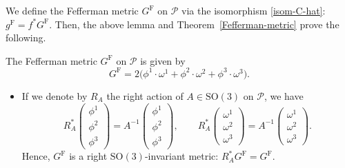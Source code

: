 We define the Fefferman metric $G^{\mathrm{F}}$ on $\mathcal{P}$ via the isomorphism \eqref{isom-C-hat}: $g^{\mathrm{F}}=f^* G^{\mathrm{F}}$. Then, the above lemma and Theorem~\ref{Fefferman-metric} prove the following.

\begin{Proposition}
The Fefferman metric $G^{\mathrm{F}}$ on $\mathcal{P}$ is given by
\[
G^{\mathrm{F}}=2\bigl( \phi^1\cdot\omega^1+ \phi^2\cdot\omega^2+ \phi^3\cdot\omega^3\bigr).
\]
\end{Proposition}

\begin{Remark}\quad
\begin{itemize}\itemsep=0pt
\item[(i)]
If we denote by $R_A$ the right action of $A\in\mathrm{SO}(3)$ on $\mathcal{P}$, we have
\[
R_A^*\begin{pmatrix}
\phi^1 \\ \phi^2 \\ \phi^3
\end{pmatrix}=A^{-1}\begin{pmatrix}
\phi^1 \\ \phi^2 \\ \phi^3
\end{pmatrix}, \qquad R_A^*\begin{pmatrix}
\omega^1 \\ \omega^2 \\ \omega^3
\end{pmatrix}=A^{-1}\begin{pmatrix}
\omega^1 \\ \omega^2 \\ \omega^3
\end{pmatrix}.
\]
Hence, $G^{\mathrm{F}}$ is a right $\mathrm{SO}(3)$-invariant metric: $R_A^*G^{\mathrm{F}}=G^{\mathrm{F}}$.


\end{itemize}
\end{Remark}
